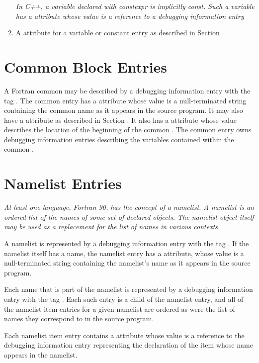 \begin{enumerate}[1.]
\textit{In C++,
a variable declared with constexpr is implicitly const. Such a
variable has a  attribute whose value is a reference
to a debugging information entry}

\item A  attribute for a 
variable or constant entry as described in 
Section .

\end{enumerate}

\section{Common Block Entries}
\label{chap:commonblockentries}
A Fortran common  may be described by a debugging
information entry with the 
tag . 
The
common  
entry has a  attribute whose value
is a null-terminated string containing the common 
name as it appears in the source program. It may also have a
 attribute as described in 
Section . 
It
also has a  attribute whose value describes the
location of the beginning of the common . The common
 entry owns debugging information entries describing
the variables contained within the common .

\section{Namelist Entries}
\label{chap:namelistentries}
\textit{At least one language, Fortran 90, has the concept of a
namelist. A namelist is an ordered list of the names of some
set of declared objects. The namelist object itself may be used
as a replacement for the list of names in various contexts.}

A namelist is represented by a debugging information entry
with the 
tag . 
If the namelist itself has a
name, the namelist entry has a  attribute, whose
value is a null-terminated string containing the namelist’s
name as it appears in the source program.

Each name that is part of the namelist is represented
by a debugging information entry with the tag
. 
Each such entry is a child of the
namelist entry, and all of the namelist item entries for a
given namelist are ordered as were the list of names they
correspond to in the source program.

Each namelist item entry contains a 
attribute whose value is a reference to the debugging
information entry representing the declaration of the item
whose name appears in the namelist.


